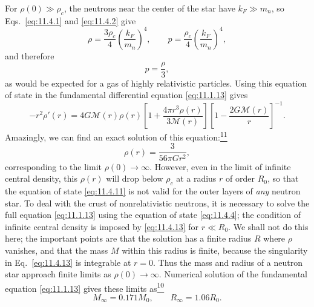 For \(\rho(0)\gg\rho_c\), the neutrons near the center of the star have
\(k_F\gg m_n\), so Eqs.~\eqref{eq:11.4.1} and \eqref{eq:11.4.2} give
\[
  \rho=\frac{3\rho_c}{4}\left(\frac{k_F}{m_n}\right)^4,
  \qquad
  p=\frac{\rho_c}{4}\left(\frac{k_F}{m_n}\right)^4,
\]
and therefore
\begin{equation}
  p=\frac{\rho}{3},
  \tag{11.4.11}\label{eq:11.4.11}
\end{equation}
as would be expected for a gas of highly relativistic particles. Using this
equation of state in the fundamental differential equation
\eqref{eq:11.1.13} gives
\begin{equation}
  -r^2\rho'(r)
  =
  4G\mathcal{M}(r)\rho(r)
  \left[1+\frac{4\pi r^3\rho(r)}{3\mathcal{M}(r)}\right]
  \left[1-\frac{2G\mathcal{M}(r)}r\right]^{-1}.
  \tag{11.4.12}\label{eq:11.4.12}
\end{equation}
Amazingly, we can find an exact solution of this
equation:\hyperref[ch11-ref-11]{\textsuperscript{11}}
\begin{equation}
  \rho(r)=\frac{3}{56\pi Gr^2},
  \tag{11.4.13}\label{eq:11.4.13}
\end{equation}
corresponding to the limit \(\rho(0)\to\infty\). However, even in the limit
of infinite central density, this \(\rho(r)\) will drop below \(\rho_c\) at a
radius \(r\) of order \(R_0\), so that the equation of state
\eqref{eq:11.4.11} is not valid for the outer layers of \emph{any} neutron
star. To deal with the crust of nonrelativistic neutrons, it is necessary to
solve the full equation \eqref{eq:11.1.13} using the equation of state
\eqref{eq:11.4.4}; the condition of infinite central density is imposed by
\eqref{eq:11.4.13} for \(r\ll R_0\). We shall not do this here; the important
points are that the solution has a finite radius \(R\) where \(\rho\)
vanishes, and that the mass \(M\) within this radius is finite, because the
singularity in Eq.~\eqref{eq:11.4.13} is integrable at \(r=0\). Thus the
mass and radius of a neutron star approach finite limits as
\(\rho(0)\to\infty\). Numerical solution of the fundamental equation
\eqref{eq:11.1.13} gives these limits
as\hyperref[ch11-ref-10]{\textsuperscript{10}}
\begin{equation}
  M_\infty=0.171M_0,\qquad R_\infty=1.06R_0.
  \tag{11.4.14}\label{eq:11.4.14}
\end{equation}


